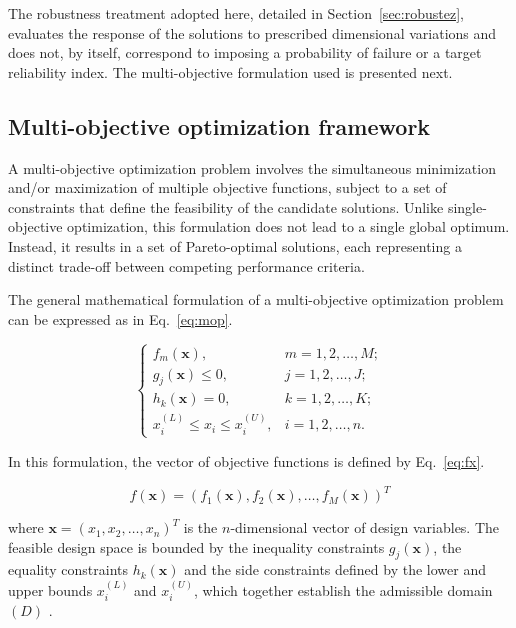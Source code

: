 The robustness treatment adopted here, detailed in Section~\ref{sec:robustez}, evaluates the response of the solutions to prescribed dimensional variations and does not, by itself, correspond to imposing a probability of failure or a target reliability index.
The multi-objective formulation used is presented next.

\subsection{Multi-objective optimization framework}\label{sec:otim_multiobjetivo}

A multi-objective optimization problem involves the simultaneous minimization and/or maximization of multiple objective functions, subject to a set of constraints that define the feasibility of the candidate solutions.
Unlike single-objective optimization, this formulation does not lead to a single global optimum.
Instead, it results in a set of Pareto-optimal solutions, each representing a distinct trade-off between competing performance criteria.

The general mathematical formulation of a multi-objective optimization problem can be expressed as in Eq.~\eqref{eq:mop}.

\begin{equation}
\left\{
\begin{array}{ll}
f_m(\mathbf{x}), & m = 1,2,\ldots,M; \\
g_j(\mathbf{x}) \leq 0, & j = 1,2,\ldots,J; \\
h_k(\mathbf{x}) = 0, & k = 1,2,\ldots,K; \\
x_i^{(L)} \leq x_i \leq x_i^{(U)}, & i = 1,2,\ldots,n.
\end{array}
\right.
\label{eq:mop}
\end{equation}

In this formulation, the vector of objective functions is defined by Eq.~\eqref{eq:fx}.

 \begin{equation}
 f(\mathbf{x}) = \left(f_1(\mathbf{x}), f_2(\mathbf{x}), \ldots, f_M(\mathbf{x})\right)^T\label{eq:fx}
 \end{equation}

where $\mathbf{x} = (x_1, x_2, \ldots, x_n)^T$ is the $n$-dimensional vector of design variables.
The feasible design space is bounded by the inequality constraints $g_j(\mathbf{x})$, the equality constraints $h_k(\mathbf{x})$ and the side constraints defined by the lower and upper bounds $x_i^{(L)}$ and $x_i^{(U)}$, which together establish the admissible domain $(D)$ \parencite{DEB2009}.

